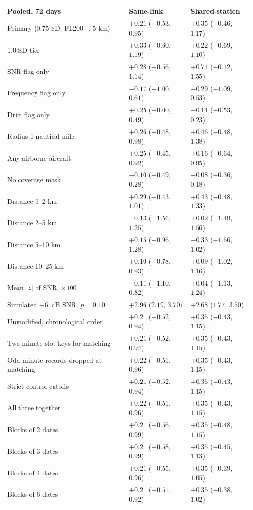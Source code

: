 \documentclass[11pt]{article}
\begin{document}
\begin{appendices}
\begin{center}
\small
\begin{tabular}{lll}
\toprule
Pooled, 72 days & Same-link & Shared-station \\
\midrule
Primary (0.75 SD, FL200+, 5 km) & $+0.21$ ($-0.53$, $0.95$) & $+0.35$ ($-0.46$, $1.17$) \\
1.0 SD tier & $+0.33$ ($-0.60$, $1.19$) & $+0.22$ ($-0.69$, $1.10$) \\
SNR flag only & $+0.28$ ($-0.56$, $1.14$) & $+0.71$ ($-0.12$, $1.55$) \\
Frequency flag only & $-0.17$ ($-1.00$, $0.61$) & $-0.29$ ($-1.09$, $0.53$) \\
Drift flag only & $+0.25$ ($-0.00$, $0.49$) & $-0.14$ ($-0.53$, $0.23$) \\
Radius 1 nautical mile & $+0.26$ ($-0.48$, $0.98$) & $+0.46$ ($-0.48$, $1.38$) \\
Any airborne aircraft & $+0.25$ ($-0.45$, $0.92$) & $+0.16$ ($-0.64$, $0.95$) \\
No coverage mask & $-0.10$ ($-0.49$, $0.28$) & $-0.08$ ($-0.36$, $0.18$) \\
Distance 0--2 km & $+0.29$ ($-0.43$, $1.01$) & $+0.43$ ($-0.48$, $1.33$) \\
Distance 2--5 km & $-0.13$ ($-1.56$, $1.25$) & $+0.02$ ($-1.49$, $1.56$) \\
Distance 5--10 km & $+0.15$ ($-0.96$, $1.28$) & $-0.33$ ($-1.66$, $1.02$) \\
Distance 10--25 km & $+0.10$ ($-0.78$, $0.93$) & $+0.09$ ($-1.02$, $1.16$) \\
Mean $|z|$ of SNR, $\times100$ & $-0.11$ ($-1.10$, $0.82$) & $+0.04$ ($-1.13$, $1.24$) \\
Simulated $+6$~dB SNR, $p=0.10$ & $+2.96$ ($2.19$, $3.70$) & $+2.68$ ($1.77$, $3.60$) \\
\midrule
Unmodified, chronological order & $+0.21$ ($-0.52$, $0.94$) & $+0.35$ ($-0.43$, $1.15$) \\
Two-minute slot keys for matching & $+0.21$ ($-0.52$, $0.94$) & $+0.35$ ($-0.43$, $1.15$) \\
Odd-minute records dropped at matching & $+0.22$ ($-0.51$, $0.96$) & $+0.35$ ($-0.43$, $1.15$) \\
Strict control cutoffs & $+0.21$ ($-0.52$, $0.94$) & $+0.35$ ($-0.43$, $1.15$) \\
All three together & $+0.22$ ($-0.51$, $0.96$) & $+0.35$ ($-0.43$, $1.15$) \\
Blocks of 2 dates & $+0.21$ ($-0.56$, $0.99$) & $+0.35$ ($-0.48$, $1.15$) \\
Blocks of 3 dates & $+0.21$ ($-0.58$, $0.99$) & $+0.35$ ($-0.45$, $1.13$) \\
Blocks of 4 dates & $+0.21$ ($-0.55$, $0.96$) & $+0.35$ ($-0.39$, $1.05$) \\
Blocks of 6 dates & $+0.21$ ($-0.51$, $0.92$) & $+0.35$ ($-0.38$, $1.02$) \\
\bottomrule
\end{tabular}
\end{center}


\end{appendices}
\end{document}
